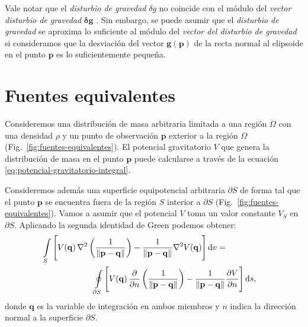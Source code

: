 Vale notar que el \emph{disturbio de gravedad} $\delta g$ no coincide con el
módulo del \emph{vector disturbio de gravedad} $\boldsymbol\delta \mathbf{g}$
\citep{barthelmes2013,sanso2013,oliveira2018}.
Sin embargo, se puede asumir que el \emph{disturbio de gravedad} se aproxima lo
suficiente al módulo del \emph{vector del disturbio de gravedad} si
consideramos que la desviación del vector $\mathbf{g}(\mathbf{p})$ de la recta
normal al elipsoide en el punto $\mathbf{p}$ es lo suficientemente pequeña.


\section{Fuentes equivalentes}

Consideremos una distribución de masa arbitraria limitada a una región $\Omega$
con una densidad $\rho$ y un punto de observación $\mathbf{p}$ exterior a la
región $\Omega$ (Fig.~\ref{fig:fuentes-equivalentes}).
El potencial gravitatorio $V$ que genera la distribución de masa en el punto
$\mathbf{p}$ puede calcularse a través de la ecuación
\ref{eq:potencial-gravitatorio-integral}.

Consideremos además una superficie equipotencial arbitraria $\partial S$ de
forma tal que el punto $\mathbf{p}$ se encuentra fuera de la región $S$
interior a $\partial S$ (Fig.~\ref{fig:fuentes-equivalentes}).
Vamos a asumir que el potencial $V$ toma un valor constante $V_S$ en
$\partial S$.
Aplicando la segunda identidad de Green \citep[][p.~23]{blakely1995} podemos
obtener:
%
\begin{equation}
    \begin{split}
    \int\limits_S
        \Bigg[
            V(\mathbf{q}) \,
            \nabla^2 \left( \frac{1}{\left\lVert \mathbf{p} - \mathbf{q}
                \right\rVert} \right)
            - \frac{1}{\left\lVert \mathbf{p} - \mathbf{q} \right\rVert}
            \nabla^2 V(\mathbf{q})
        \Bigg]
    \mathop{}\!\textnormal{d} v
    = \\
    \oint\limits_{\partial S}
        \Bigg[
            V(\mathbf{q}) \,
            \frac{\partial}{\partial n}
            \left(
                \frac{1}{\left\lVert \mathbf{p} - \mathbf{q} \right\rVert}
            \right)
            -
            \frac{1}{\left\lVert \mathbf{p} - \mathbf{q} \right\rVert}
            &\frac{\partial V}{\partial n}
        \Bigg]
    \mathop{}\!\textnormal{d} s,
    \end{split}
\end{equation}
%
donde $\mathbf{q}$ es la variable de integración en ambos miembros
y $n$ indica la dirección normal a la superficie $\partial S$.

